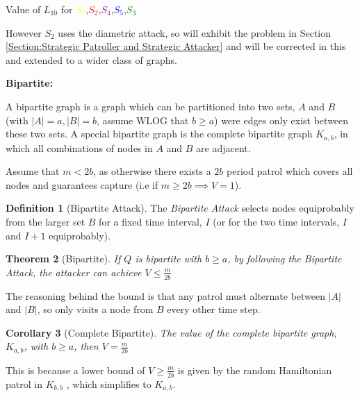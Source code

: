 \documentclass[a4paper,10pt]{article}
\newtheorem{theorem}{Theorem}[section]
\newtheorem{corollary}[theorem]{Corollary}
\theoremstyle{definition}
\newtheorem{definition}[theorem]{Definition}
\theoremstyle{definition}
\theoremstyle{remark}
\theoremstyle{definition}
\begin{document}
\begin{myfigure}
\begin{center}

\end{center}
\caption{Value of $L_{10}$ for \textcolor{yellow}{$S_{1}$},\textcolor{red}{$S_{2}$},\textcolor{purple}{$S_{4}$},\textcolor{blue}{$S_{5}$},\textcolor{green}{$S_{3}$}}
\end{myfigure}


However $S_{2}$ uses the diametric attack, so will exhibit the problem in Section \ref{Section:Strategic Patroller and Strategic Attacker} and will be corrected in this and extended to a wider class of graphs.

\textbf{Bipartite:}

A bipartite graph is a graph which can be partitioned into two sets, $A$ and $B$ (with $|A|=a,|B|=b$, assume WLOG that $b \geq a$) were edges only exist between these two sets. A special bipartite graph is the complete bipartite graph $K_{a,b}$, in which all combinations of nodes in $A$ and $B$ are adjacent.

Assume that $m < 2b$, as otherwise there exists a $2b$ period patrol which covers all nodes and guarantees capture (i.e if $m \geq 2b  \implies V=1$).

\begin{definition}[Bipartite Attack]
The \textit{Bipartite Attack} selects nodes equiprobably from the larger set $B$ for a fixed time interval, $I$ (or for the two time intervals, $I$ and $I+1$ equiprobably).
\end{definition}

\begin{theorem}[Bipartite]
If $Q$ is bipartite with $b \geq a$, by following the Bipartite Attack, the attacker can achieve $V \leq \frac{m}{2b}$
\end{theorem}

The reasoning behind the bound is that any patrol must alternate between $|A|$ and $|B|$, so only visits a node from $B$ every other time step. 

\begin{corollary}[Complete Bipartite]
\label{Corollary:Complete Bipartite}
The value of the complete bipartite graph, $K_{a,b}$, with $b \geq a$, then $V=\frac{m}{2b}$
\end{corollary}

This is because a lower bound of $V \geq \frac{m}{2b}$ is given by the random Hamiltonian patrol in $K_{b,b}$ , which simplifies to $K_{a,b}$.
\end{document}
